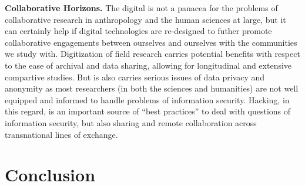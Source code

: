 \documentclass[10pt,letter,oneside]{scrartcl}
\begin{document}

{\bf Collaborative Horizons.} The digital is not a panacea for the problems of collaborative 
research in anthropology and the human sciences at large, but it can certainly help 
if digital technologies are re-designed to futher promote collaborative engagements 
between ourselves and ourselves with the communities we study with. Digitization of 
field research carries potential benefits with respect to the ease of archival and 
data sharing, allowing for longitudinal and extensive compartive studies. But is also 
carries serious issues of data privacy and anonymity as most researchers (in both the 
sciences and humanities) are not well equipped and informed to handle problems of 
information security. Hacking, in this regard, is an important source of ``best practices'' 
to deal with questions of information security, but also sharing and remote collaboration across transnational lines of exchange.




\section*{Conclusion}


% 
%

\printbibliography 
\end{document}
